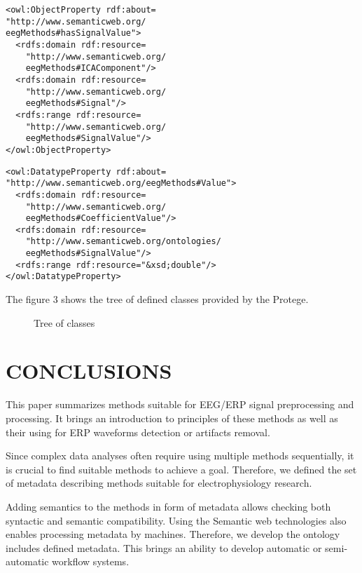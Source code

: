 \documentclass[a4paper,twoside]{article}
\begin{document}
\begin{small}
\begin{verbatim}
<owl:ObjectProperty rdf:about=
"http://www.semanticweb.org/
eegMethods#hasSignalValue">
  <rdfs:domain rdf:resource=
    "http://www.semanticweb.org/
    eegMethods#ICAComponent"/>
  <rdfs:domain rdf:resource=
    "http://www.semanticweb.org/
    eegMethods#Signal"/>
  <rdfs:range rdf:resource=
    "http://www.semanticweb.org/
    eegMethods#SignalValue"/>
</owl:ObjectProperty>
\end{verbatim}
\end{small}

\begin{small}
\begin{verbatim}
<owl:DatatypeProperty rdf:about=
"http://www.semanticweb.org/eegMethods#Value">
  <rdfs:domain rdf:resource=
    "http://www.semanticweb.org/
    eegMethods#CoefficientValue"/>
  <rdfs:domain rdf:resource=
    "http://www.semanticweb.org/ontologies/
    eegMethods#SignalValue"/>
  <rdfs:range rdf:resource="&xsd;double"/>
</owl:DatatypeProperty>
\end{verbatim}
\end{small}

\noindent The figure 3 shows the tree of defined classes provided by the Protege.

\begin{figure}[!h]

  \centering
   {}
  \caption{Tree of classes} 
  \label{fig:classTree}
 \end{figure}

\section{\uppercase{Conclusions}}
\label{sec:conclusion}

\noindent This paper summarizes methods suitable for EEG/ERP signal
preprocessing and processing. It brings an introduction
to principles of these methods as well as their using
for ERP waveforms detection or artifacts removal.

Since complex data analyses often require using multiple methods sequentially, it is crucial to find suitable methods to achieve a goal. Therefore, we defined the set of metadata describing methods suitable for electrophysiology research.

Adding semantics to the methods in form of metadata allows checking both syntactic and semantic compatibility. Using the Semantic web technologies also enables processing metadata by machines. Therefore, we develop the ontology includes defined metadata. This brings an ability to develop automatic or semi-automatic workflow systems.
\end{document}

